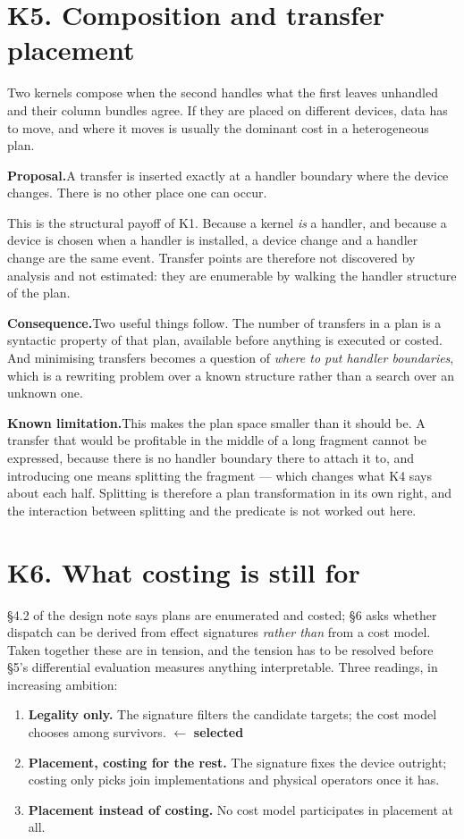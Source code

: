 \documentclass[11pt,a4paper]{article}
\newcommand{\selected}{\textcolor{decided}{$\leftarrow$ \textbf{selected}}}
\newcommand{\limitation}[1]{%
  \par\noindent\textbf{Known limitation.}\quad #1\par\medskip}
\newcommand{\proposal}[1]{%
  \par\medskip\noindent\textcolor{open}{\textbf{Proposal.}}\quad #1\par\medskip}
\newcommand{\consequence}[1]{%
  \par\noindent\textbf{Consequence.}\quad #1\par\medskip}
\begin{document}
\section{K5. Composition and transfer placement}

Two kernels compose when the second handles what the first leaves unhandled
and their column bundles agree. If they are placed on different devices, data
has to move, and where it moves is usually the dominant cost in a
heterogeneous plan.

\proposal{A transfer is inserted exactly at a handler boundary where the
device changes. There is no other place one can occur.}

This is the structural payoff of K1. Because a kernel \emph{is} a handler, and
because a device is chosen when a handler is installed, a device change and a
handler change are the same event. Transfer points are therefore not
discovered by analysis and not estimated: they are enumerable by walking the
handler structure of the plan.

\consequence{Two useful things follow. The number of transfers in a plan is a
syntactic property of that plan, available before anything is executed or
costed. And minimising transfers becomes a question of \emph{where to put
handler boundaries}, which is a rewriting problem over a known structure rather
than a search over an unknown one.}

\limitation{This makes the plan space smaller than it should be. A transfer
that would be profitable in the middle of a long fragment cannot be expressed,
because there is no handler boundary there to attach it to, and introducing one
means splitting the fragment --- which changes what K4 says about each half.
Splitting is therefore a plan transformation in its own right, and the
interaction between splitting and the predicate is not worked out here.}

\section{K6. What costing is still for}

§4.2 of the design note says plans are enumerated and costed; §6 asks whether
dispatch can be derived from effect signatures \emph{rather than} from a cost
model. Taken together these are in tension, and the tension has to be resolved
before §5's differential evaluation measures anything interpretable. Three
readings, in increasing ambition:

\begin{enumerate}[label=\textbf{(\arabic*)}]
  \item \textbf{Legality only.} The signature filters the candidate targets;
        the cost model chooses among survivors. \selected
  \item \textbf{Placement, costing for the rest.} The signature fixes the
        device outright; costing only picks join implementations and physical
        operators once it has.
  \item \textbf{Placement instead of costing.} No cost model participates in
        placement at all.
\end{enumerate}
\end{document}
